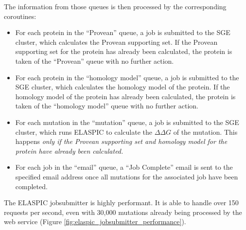 The information from those queues is then processed by the corresponding coroutines:

\vspace{-\topsep}
\begin{itemize}
	\itemsep0em
	\item For each protein in the ``Provean'' queue, a job is submitted to the SGE cluster, which calculates the Provean supporting set. If the Provean supporting set for the protein has already been calculated, the protein is taken of the ``Provean'' queue with no further action.
	\item For each protein in the ``homology model'' queue, a job is submitted to the SGE cluster, which calculates the homology model of the protein. If the homology model of the protein has already been calculated, the protein is taken of the ``homology model'' queue with no further action.
	\item For each mutation in the ``mutation'' queue, a job is submitted to the SGE cluster, which runs ELASPIC to calculate the $\Delta \Delta G$ of the mutation. This happens \textit{only if the Provean supporting set and homology model for the protein have already been calculated.}
	\item For each job in the ``email'' queue, a ``Job Complete'' email is sent to the specified email address once all mutations for the associated job have been completed.
\end{itemize}

The ELASPIC jobsubmitter is highly performant. It is able to handle over 150 requests per second, even with 30,000 mutations already being processed by the web service (Figure \ref{fig:elaspic_jobsubmitter_performance}).

